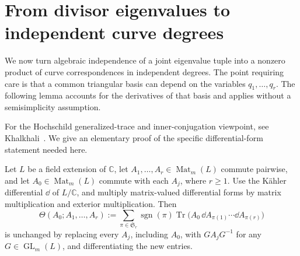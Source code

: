 \section{From divisor eigenvalues to independent curve degrees}
\label{sec:trace}

We now turn algebraic independence of a joint eigenvalue tuple into a
nonzero product of curve correspondences in independent degrees.  The
point requiring care is that a common triangular basis can depend on
the variables $q_1,\ldots,q_r$.  The following lemma accounts for the derivatives
of that basis and applies without a semisimplicity assumption.

For the Hochschild generalized-trace and inner-conjugation viewpoint,
see Khalkhali~\cite[Section~3.5, Examples~3.5.5--3.5.6 and Lemma~3.5.1]{Khalkhali2009}.
We give an elementary proof of the specific differential-form statement
needed here.

\begin{lemma}
\label{lem:alternating-trace}
Let $L$ be a field extension of $\mathbb C$, let
$A_1,\ldots,A_r\in\operatorname{Mat}_m(L)$ commute pairwise, and let
$A_0\in\operatorname{Mat}_m(L)$ commute with each $A_j$, where $r\geq1$.
Use the K\"ahler differential $\dd$ of $L/\mathbb C$, and multiply
matrix-valued differential forms by matrix multiplication and exterior
multiplication.  Then
\begin{equation}
\label{eq:alternating-trace}
 \Theta(A_0;A_1,\ldots,A_r)
 :=\sum_{\pi\in\mathfrak S_r}\operatorname{sgn}(\pi)
 \operatorname{Tr}\bigl(A_0\,\dd A_{\pi(1)}\cdots \dd A_{\pi(r)}\bigr)
\end{equation}
is unchanged by replacing every $A_j$, including $A_0$, with
$GA_jG^{-1}$ for any $G\in\operatorname{GL}_m(L)$, and differentiating
the new entries.
\end{lemma}

